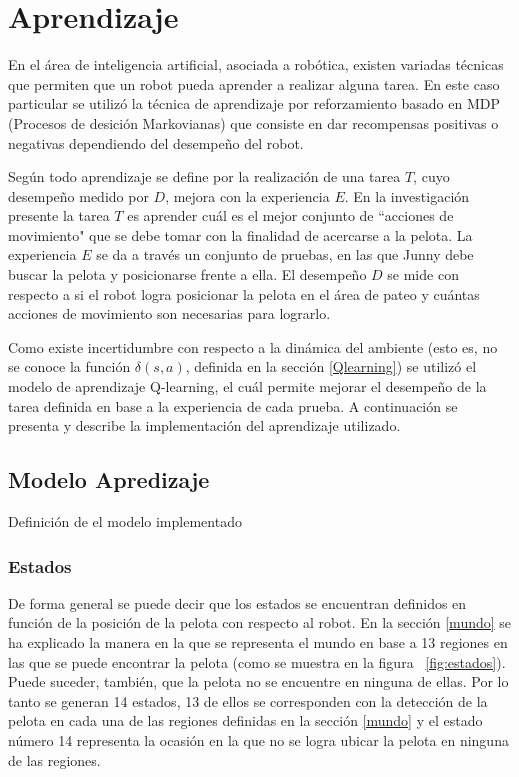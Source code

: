 
\section{Aprendizaje}\label{aprendizaje}
 
En el área de inteligencia artificial, asociada a robótica, existen variadas técnicas que permiten que un robot pueda aprender a realizar alguna tarea. En este caso particular se utiliz\'o la técnica de aprendizaje por reforzamiento basado en MDP (Procesos de desici\'on Markovianas) que consiste en dar recompensas positivas o negativas dependiendo del desempeño del robot.

Según \cite{Mitchell} todo aprendizaje se define por la realización de una tarea $T$, cuyo desempeño medido por $D$, mejora con la experiencia $E$. En la investigación presente la tarea $T$ es aprender cuál es el mejor conjunto de ``acciones de movimiento" que se debe tomar con la finalidad de acercarse a la pelota. La experiencia $E$ se da a través un conjunto de pruebas, en las que Junny debe buscar la pelota y posicionarse frente a ella. El desempeño $D$ se mide con respecto a si el robot logra posicionar la pelota en el área de pateo y cuántas acciones de movimiento son necesarias para lograrlo.

Como existe incertidumbre con respecto a la dinámica del ambiente (esto es, no se conoce la función $\delta(s,a)$, definida en la sección \ref{Qlearning}) se utilizó el modelo de aprendizaje Q-learning, el cu\'al permite mejorar el desempeño de la tarea definida en base a la experiencia de cada prueba. A continuación se presenta y describe la implementación del aprendizaje utilizado.

\subsection{Modelo Apredizaje}

Definici\'on de el modelo implementado

\subsubsection{Estados}

De forma general se puede decir que los estados se encuentran definidos en función de la posición de la pelota con respecto al robot. En la sección \ref{mundo} se ha explicado la manera en la que se representa el mundo en base a 13 regiones en las que se puede encontrar la pelota (como se muestra en la figura ~\ref{fig:estados}). Puede suceder, también, que la pelota no se encuentre en ninguna de ellas. Por lo tanto se generan 14 estados, 13 de ellos se corresponden con la detección de la pelota en cada una de las regiones definidas en la sección \ref{mundo} y el estado número 14 representa la ocasión en la que no se logra ubicar la pelota en ninguna de las regiones. 

